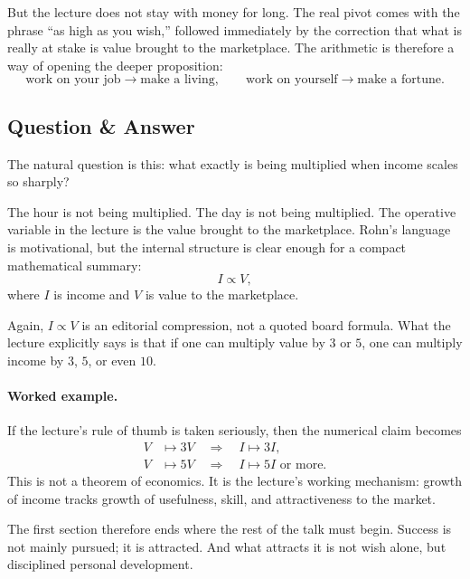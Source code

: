 But the lecture does not stay with money for long. The real pivot comes with the phrase ``as high as you wish,'' followed immediately by the correction that what is really at stake is value brought to the marketplace. The arithmetic is therefore a way of opening the deeper proposition:
\begin{equation}
\text{work on your job} \to \text{make a living}, \qquad
\text{work on yourself} \to \text{make a fortune}.
\end{equation}

\subsection{Question \& Answer}

The natural question is this: what exactly is being multiplied when income scales so sharply?

The hour is not being multiplied. The day is not being multiplied. The operative variable in the lecture is the value brought to the marketplace. Rohn's language is motivational, but the internal structure is clear enough for a compact mathematical summary:
\begin{equation}
I \propto V,
\end{equation}
where \(I\) is income and \(V\) is value to the marketplace.

\begin{remark}
Again, \(I \propto V\) is an editorial compression, not a quoted board formula. What the lecture explicitly says is that if one can multiply value by \(3\) or \(5\), one can multiply income by \(3\), \(5\), or even \(10\).
\end{remark}

\paragraph{Worked example.}
If the lecture's rule of thumb is taken seriously, then the numerical claim becomes
\begin{align}
V &\mapsto 3V \quad \Rightarrow \quad I \mapsto 3I,\\
V &\mapsto 5V \quad \Rightarrow \quad I \mapsto 5I \text{ or more}.
\end{align}
This is not a theorem of economics. It is the lecture's working mechanism: growth of income tracks growth of usefulness, skill, and attractiveness to the market.

The first section therefore ends where the rest of the talk must begin. Success is not mainly pursued; it is attracted. And what attracts it is not wish alone, but disciplined personal development.

